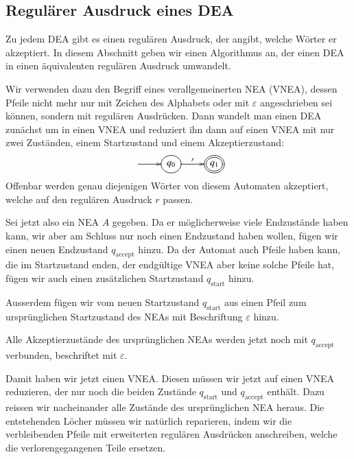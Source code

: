 \subsection{Regulärer Ausdruck eines DEA\label{regulaer:dea-re}}
Zu jedem DEA gibt es einen regulären Ausdruck, der angibt,
welche Wörter er akzeptiert.
In diesem Abschnitt geben
wir einen Algorithmus an, der einen DEA in einen äquivalenten
regulären Ausdruck umwandelt.

%
%
Wir verwenden dazu den Begriff eines verallgemeinerten NEA (VNEA),
dessen Pfeile nicht mehr nur mit Zeichen des Alphabets oder mit
$\varepsilon$ angeschrieben sei können, sondern mit regulären
Ausdrücken.
Dann wandelt man einen DEA zunächst um in einen
VNEA und reduziert ihn dann auf einen VNEA mit nur zwei Zuständen,
einem Startzustand und einem Akzeptierzustand:
\[
\entrymodifiers={++[o][F]}
\xymatrix{
*+\txt{}\ar[r]
	&{q_0}\ar[r]^{r}
		&*++[o][F=]{q_1}
}
\]
Offenbar werden genau diejenigen Wörter von diesem Automaten
akzeptiert, welche auf den regulären Ausdruck $r$ passen.

Sei jetzt also ein NEA $A$ gegeben.
Da er möglicherweise viele
Endzustände haben kann, wir aber am Schluss nur noch einen
Endzustand haben wollen, fügen wir einen neuen Endzustand
$q_{\text{accept}}$ hinzu.
Da der Automat auch Pfeile haben kann, die im Startzustand enden,
der endgültige VNEA aber keine solche Pfeile hat, fügen wir
auch einen zusätzlichen Startzustand $q_{\text{start}}$ hinzu.


Ausserdem fügen wir vom neuen Startzustand $q_{\text{start}}$
aus einen Pfeil zum ursprünglichen Startzustand des NEAs mit Beschriftung $\varepsilon$ hinzu.

Alle Akzeptierzustände des ursprünglichen NEAs werden jetzt noch mit
$q_{\text{accept}}$ verbunden, beschriftet mit $\varepsilon$.

Damit haben wir jetzt einen VNEA.
Diesen müssen wir jetzt auf einen VNEA reduzieren, der nur noch
die beiden Zustände $q_{\text{start}}$ und $q_{\text{accept}}$
enthält.
Dazu reissen wir nacheinander alle Zustände des ursprünglichen
NEA heraus.
Die entstehenden Löcher müssen wir natürlich reparieren, indem wir die
verbleibenden Pfeile mit erweiterten regulären Ausdrücken
anschreiben, welche die verlorengegangenen Teile ersetzen.

